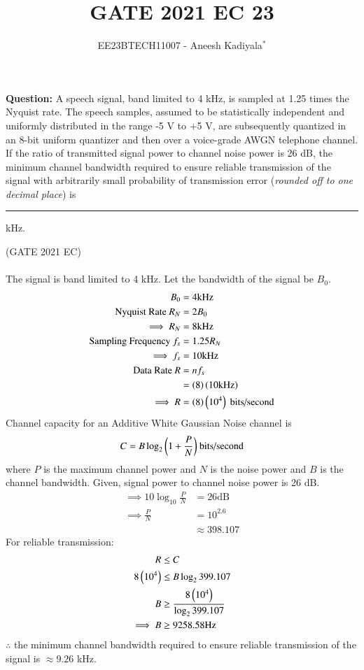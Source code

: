 \documentclass[journal,12pt,twocolumn]{IEEEtran}
\theoremstyle{remark}
\begin{document}

\vspace{3cm}

\title{GATE 2021 EC 23}
\author{EE23BTECH11007 - Aneesh Kadiyala$^{*}$%
}
\maketitle
\newpage
\bigskip

\renewcommand{\thefigure}{\theenumi}
\renewcommand{\thetable}{\theenumi}

\vspace{3cm}
\textbf{Question:} A speech signal, band limited to 4 kHz, is sampled at 1.25 times the Nyquist rate. The speech samples, assumed to be statistically independent and uniformly distributed in the range -5 V to +5 V, are subsequently quantized in an 8-bit uniform quantizer and then over a voice-grade AWGN telephone channel. If the ratio of transmitted signal power to channel noise power is 26 dB, the minimum channel bandwidth required to ensure reliable transmission of the signal with arbitrarily small probability of transmission error (\textit{rounded off to one decimal place}) is \rule{1cm}{0.15mm} kHz.

\hfill(GATE 2021 EC)
\\
\solution
\\
The signal is band limited to 4 kHz.
Let the bandwidth of the signal be $B_0$.
\begin{align}
B_0 &= 4\text{kHz} \\
\text{Nyquist Rate } R_N &= 2B_0 \\
\implies R_N &= 8\text{kHz} \\
\text{Sampling Frequency } f_s &= 1.25R_N \\
\implies f_s &= 10\text{kHz} \\
\text{Data Rate } R &= nf_s \\
&= \left(8\right)\left(10\text{kHz}\right) \\
\implies R &= \left(8\right)\left(10^4\right)\text{ bits/second}
\end{align}
Channel capacity for an Additive White Gaussian Noise channel is
\begin{align}
C = B\log_2{\left(1 + \frac{P}{N}\right)}\text{ bits/second}
\end{align}
where $P$ is the maximum channel power and $N$ is the noise power and $B$ is the channel bandwidth.
Given, signal power to channel noise power is 26 dB.
\begin{align}
\implies 10\log_{10}{\frac{P}{N}} &= 26\text{dB} \\
\implies \frac{P}{N} &= 10^{2.6} \\
&\approx 398.107
\end{align}
For reliable transmission:
\begin{align}
R &\le C \\
8\left(10^4\right) &\le B\log_2{399.107} \\
B &\ge \frac{8\left(10^4\right)}{\log_2{399.107}} \\
\implies B &\ge 9258.58\text{Hz}
\end{align}
$\therefore$ the minimum channel bandwidth required to ensure reliable transmission of the signal is $\approx9.26$ kHz.
\end{document}
